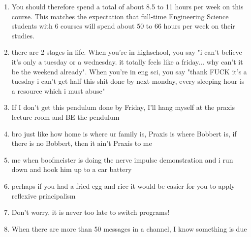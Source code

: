 \begin{enumerate}
    \item You should therefore spend a total of about 8.5 to 11 hours per week on this course. This matches the expectation that full-time Engineering Science students with 6 courses will spend about 50 to 66 hours per week on their studies.
    \item there are 2 stages in life. When you're in highschool, you say "i can't believe it's only a tuesday or a wednesday. it totally feels like a friday... why can't it be the weekend already". When you're in eng sci, you say "thank FUCK it's a tuesday i can't get half this shit done by next monday, every sleeping hour is a resource which i must abuse"
    \item If I don't get this pendulum done by Friday, I'll hang myself at the praxis lecture room and BE the pendulum
    \item bro just like how home is where ur family is, Praxis is where Bobbert is, if there is no Bobbert, then it ain't Praxis to me
    \item me when boofmeister is doing the nerve impulse demonstration and i run down and hook him up to a car battery
    \item perhaps if you had a fried egg and rice it would be easier for you to apply reflexive principalism
    \item Don't worry, it is never too late to switch programs!
    \item When there are more than 50 messages in a channel, I know something is due
\end{enumerate}
